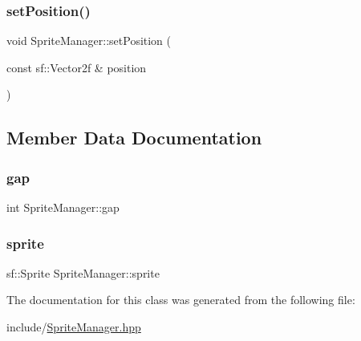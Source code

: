 \mbox{\label{class_sprite_manager_a9ef427743db56baec20673d877a63717}} 
\subsubsection{\texorpdfstring{setPosition()}{setPosition()}}
{\footnotesize\ttfamily void Sprite\+Manager\+::set\+Position (\begin{DoxyParamCaption}\item[{const sf\+::\+Vector2f \&}]{position }\end{DoxyParamCaption})\hspace{0.3cm}{\ttfamily [inline]}}



\subsection{Member Data Documentation}
\mbox{\label{class_sprite_manager_a57bba66a27411c59651af826b50ec11d}} 
\subsubsection{\texorpdfstring{gap}{gap}}
{\footnotesize\ttfamily int Sprite\+Manager\+::gap\hspace{0.3cm}{\ttfamily [private]}}

\mbox{\label{class_sprite_manager_aaa4c24e6db93bef8a28b38cb8de839c1}} 
\subsubsection{\texorpdfstring{sprite}{sprite}}
{\footnotesize\ttfamily sf\+::\+Sprite Sprite\+Manager\+::sprite\hspace{0.3cm}{\ttfamily [private]}}



The documentation for this class was generated from the following file\+:\begin{DoxyCompactItemize}
\item 
include/\mbox{\hyperlink{_sprite_manager_8hpp}{Sprite\+Manager.\+hpp}}\end{DoxyCompactItemize}
